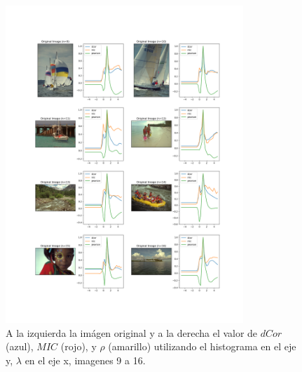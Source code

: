 \begin{figure}
    \centering
    \includegraphics[width=0.8\textwidth]{figuras/hist_comp_2.png}
    \caption{A la izquierda la im\'agen original y a la derecha el valor de $dCor$ (azul), $MIC$ (rojo), y $\rho$ (amarillo) utilizando el histograma en el eje y, $\lambda$ en el eje x, imagenes 9 a 16.}
\end{figure}



